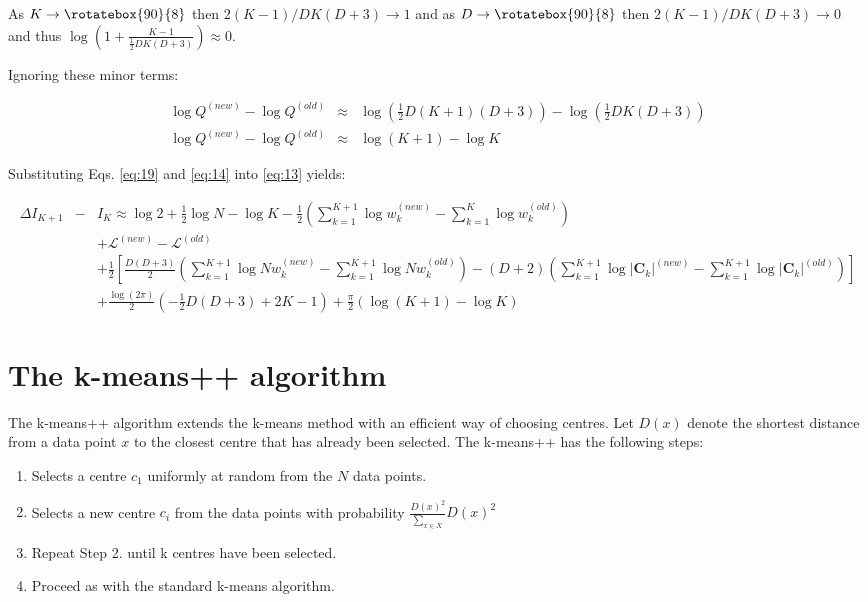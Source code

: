 \documentclass{elsarticle}
\newcommand{\vect}[1]{\boldsymbol{\mathbf{#1}}}
\def\infinity{\rotatebox{90}{8}}
\def\veccov{\vect{C}}
\begin{document}
As $K \rightarrow \infinity$ then $2(K-1)/DK(D+3) \rightarrow 1$ and as $D \rightarrow \infinity$ then $2(K-1)/DK(D+3) \rightarrow 0$ and thus $\log{\left(1 + \frac{K - 1}{\frac{1}{2}DK(D + 3)}\right)} \approx 0$.

\noindent{}Ignoring these minor terms:

\begin{eqnarray}
  \log{Q^{(new)}} - \log{Q^{(old)}} &\approx& \log{\left(\frac{1}{2}D(K+1)(D + 3)\right)} - \log{\left(\frac{1}{2}DK(D + 3)\right)} \nonumber \\
  \log{Q^{(new)}} - \log{Q^{(old)}} &\approx& \log{(K + 1)} - \log{K}
  \label{eq:19}
\end{eqnarray}

\noindent{}Substituting Eqs. \ref{eq:19} and \ref{eq:14} into \ref{eq:13} yields:

\begin{eqnarray}
\Delta{}I_{K+1} &-& I_K \approx \log{2} %
    + \frac{1}{2}\log{N} - \log{K} - \frac{1}{2}\left(\sum_{k=1}^{K+1}\log{w_k^{(new)}} - \sum_{k=1}^{K}\log{w_k^{(old)}}\right) \nonumber \\ %
&& + \mathcal{L}^{(new)} - \mathcal{L}^{(old)} \nonumber \\ %
&& + \frac{1}{2}\left[\frac{D(D+3)}{2}\left(\sum_{k=1}^{K+1}\log{Nw_k^{(new)} - \sum_{k=1}^{K+1}\log{Nw_k^{(old)}}} \right) - \left(D+2\right)\left(\sum_{k=1}^{K+1}\log{|\veccov_k|^{(new)}} - \sum_{k=1}^{K+1}\log{|\veccov_k|^{(old)}}\right)\right] \nonumber \\
&& + \frac{\log(2\pi)}{2}(-\frac{1}{2}D(D+3) + 2K  - 1) + \frac{\pi}{2}\left(\log{(K + 1)} - \log{K}\right)
\end{eqnarray}

\section{The k-means++ algorithm}

The k-means++ algorithm extends the k-means method with an efficient way of choosing centres. Let $D(x)$ denote the shortest distance from a data point $x$ to the closest centre that has already been selected. The k-means++ has the following steps:

\begin{enumerate}
	\item Selects a centre $c_1$ uniformly at random from the $N$ data points.
	\item Selects a new centre $c_i$ from the data points with probability $\frac{D(x)^2}{\sum_{x\in X}}D(x)^2$
	\item Repeat Step 2. until k centres have been selected.
	\item Proceed as with the standard k-means algorithm.
\end{enumerate}
\end{document}
